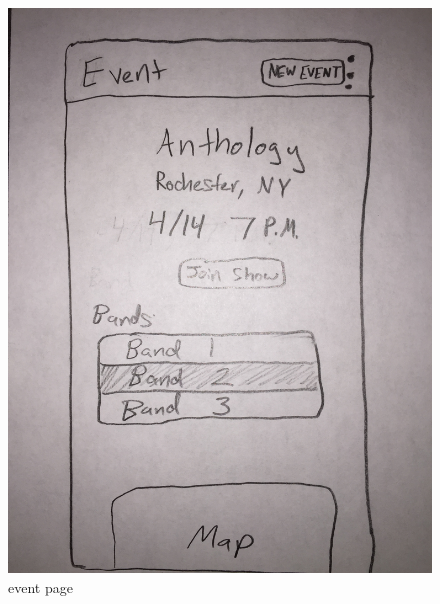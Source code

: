 \documentclass[a4paper]{article}
\begin{document}
\begin{figure}[H]
  \centering
  \begin{minipage}[b]{0.5\textwidth}
    \includegraphics[width=\textwidth]{event_page.jpg}
    \caption{event page}
  \end{minipage}
\end{figure}
\end{document}

